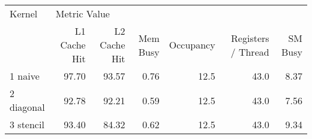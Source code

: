 \begin{tabular}{lrrrrrr}
\toprule
    Kernel & \multicolumn{6}{l}{Metric Value} \\
           & L1 Cache Hit & L2 Cache Hit & Mem Busy & Occupancy & Registers / Thread & SM Busy \\
\midrule
   1 naive &        97.70 &        93.57 &     0.76 &      12.5 &               43.0 &    8.37 \\
2 diagonal &        92.78 &        92.21 &     0.59 &      12.5 &               43.0 &    7.56 \\
 3 stencil &        93.40 &        84.32 &     0.62 &      12.5 &               43.0 &    9.34 \\
\bottomrule
\end{tabular}
